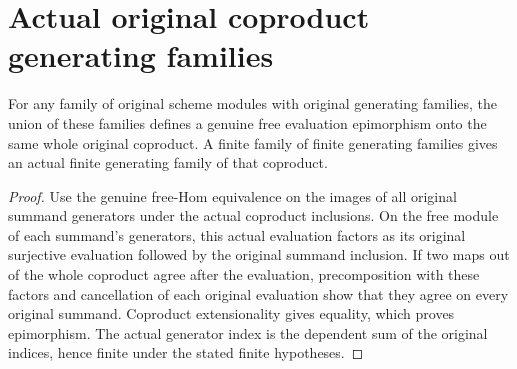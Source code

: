 \section{Actual original coproduct generating families}

\begin{lemma}
\label{lem:scheme-original-coproduct-generating-sections}
\leanok
For any family of original scheme modules with original generating families,
the union of these families defines a genuine free evaluation epimorphism
onto the same whole original coproduct. A finite family of finite generating
families gives an actual finite generating family of that coproduct.
\end{lemma}
\begin{proof}
Use the genuine free-Hom equivalence on the images of all original summand
generators under the actual coproduct inclusions. On the free module of each
summand's generators, this actual evaluation factors as its original
surjective evaluation followed by the original summand inclusion. If two
maps out of the whole coproduct agree after the evaluation, precomposition
with these factors and cancellation of each original evaluation show that
they agree on every original summand. Coproduct extensionality gives equality,
which proves epimorphism. The actual generator index is the dependent sum of
the original indices, hence finite under the stated finite hypotheses.
\end{proof}
